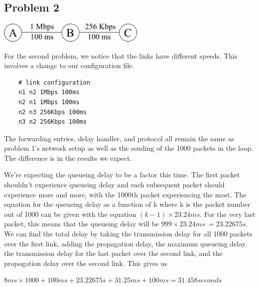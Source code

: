 \documentclass[11pt]{article}
\begin{document}
\subsection{Problem 2}

\vspace{5mm}

\includegraphics[width=7cm]{images/two-hop-2.png}

\vspace{5mm}

For the second problem, we notice that the links have different speeds. This involves a change to our configuration file.

\vspace{5mm}

\begin{lstlisting}
    # link configuration
    n1 n2 1Mbps 100ms
    n2 n1 1Mbps 100ms
    n2 n3 256Kbps 100ms
    n3 n2 256Kbps 100ms
\end{lstlisting}

\vspace{5mm}

The forwarding entries, delay handler, and protocol all remain the same as problem 1's network setup as well as the sending of the 1000 packets in the loop. The difference is in the results we expect.

We're expecting the queueing delay to be a factor this time. The first packet shouldn't experience queueing delay and each subsequent packet should experience more and more, with the 1000th packet experiencing the most. The equation for the queueing delay as a function of k where k is the packet number out of 1000 can be given with the equation \((k-1)\times23.24ms\). For the very last packet, this means that the queueing delay will be \(999\times23.24ms\ = 23.22675s\). We can find the total delay by taking the transmission delay for all 1000 packets over the first link, adding the propagation delay, the maximum queueing delay, the transmission delay for the last packet over the second link, and the propogation delay over the second link. This gives us

\vspace{5mm}

\(8ms\times1000 + 100ms + 23.22675s + 31.25ms + 100ms = 31.458 seconds\)

\vspace{5mm}
\end{document}
